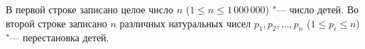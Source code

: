 В первой строке записано целое число $n$ ($1 \le n \le 1\,000\,000$) "---
число детей. Во второй строке записано $n$ различных натуральных чисел
$p_1, p_2, \ldots, p_n$ ($1 \le p_i \le n$) "--- перестановка детей.


